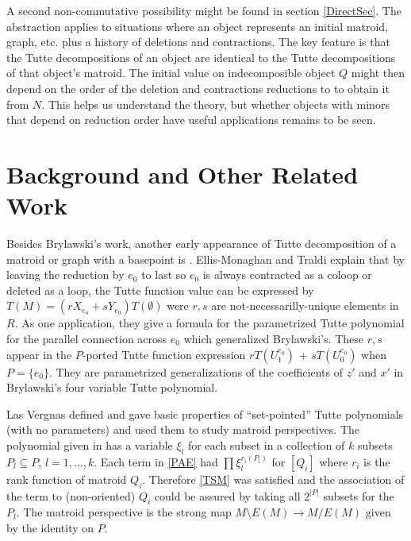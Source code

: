 \documentclass[12pt,leqno]{amsart}
\theoremstyle{remark}
\begin{document}
A second non-commutative possibility might be found in 
section \ref{DirectSec}.
The abstraction applies to situations where
an object represents an initial matroid, graph, etc. plus
a history of deletions and contractions.  
The key feature is that the Tutte decompositions
of an object are identical to the Tutte decompositions
of that object's matroid.
The initial value
on indecomposible object $Q$
might then depend on the order of the deletion and contractions
reductions to 
to obtain it from $N$.  This helps us understand the
theory, but whether objects with minors that depend on reduction 
order have useful applications remains to be seen.

\section{Background and Other Related Work}
\label{BackgroundSec}

Besides Brylawski's 
work,  another early appearance of Tutte decomposition
of a matroid or graph with a basepoint is \cite{SmithPatroids}.
Ellis-Monaghan and Traldi \cite{Ellis-Monaghan-Traldi}
explain that by leaving the reduction
by $e_0$ to last so $e_0$ is always contracted as a coloop or deleted
as a loop, the Tutte function value can be expressed by
$T(M) = (rX_{e_o} + sY_{e_0})T(\emptyset)$ were $r, s$ are 
not-necessarilly-unique elements in $R$.  As one application,
they 
give a formula for the parametrized Tutte polynomial
for the parallel connection across $e_0$
which generalized Brylawski's.
These $r,s$ appear in
the $P$-ported Tutte function expression 
$rT(U^{e_0}_1)$ $+$ $sT(U^{e_0}_0)$ when $P=\{e_0\}$.  They
are parametrized generalizations of the coefficients of
$z'$ and $x'$ in Brylawski's four variable Tutte polynomial.

Las Vergnas defined and gave basic properties of ``set-pointed'' Tutte
polynomials (with no parameters) and used them to study matroid perspectives.
The polynomial given in \cite{MR0419272,SetPointedLV} has a variable
$\xi_l$ for each subset in a collection of $k$ subsets
$P_l\subseteq P$, $l=1,\ldots,k$.  Each term in \eqref{PAE} had
$\prod\xi_l^{r_i(P_l)}$ for $[Q_i]$ where $r_i$ is the rank function 
of matroid $Q_i$.  Therefore \eqref{TSM} was satisfied and the association of the
term to (non-oriented) $Q_i$ could be assured by taking all
$2^{|P|}$ subsets for the $P_l$.  The matroid perspective is the 
strong map $M\setminus E(M)\rightarrow M/E(M)$ given by the identity on
$P$.  
\end{document}
